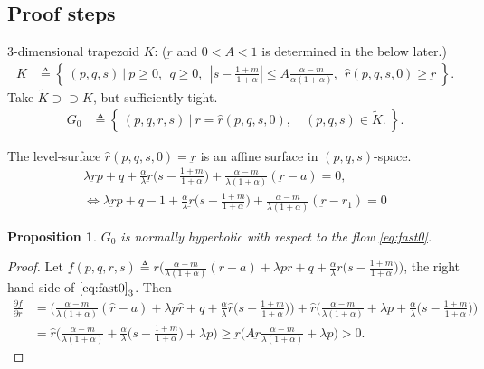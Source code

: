 \documentclass[a4paper,11pt]{article}
\newtheorem{proposition}{Proposition}[section]
\begin{document}
\subsection{Proof steps}

$3$-dimensional trapezoid $K$: ($\underbar{r}$ and $0<A<1$ is determined in the below later.)
\begin{align*}
 K &\triangleq \left\{ \: (p,q,s) \: | \:  p\ge0, ~~ q\ge0, ~~ \left|s-\frac{1+m}{1+\alpha}\right| \le A \frac{\alpha-m}{\alpha(1+\alpha)}, ~~ \hat{r}(p,q,s,0)\ge \underbar{r}\: \right\}.
\end{align*}
Take $\tilde{K} \supset\supset K$, but sufficiently tight.
\begin{align*}
 G_0 &\triangleq \left\{ \: (p,q,r,s) \: | \: r=\hat{r}(p,q,s,0), \quad (p,q,s)\in \tilde{K}. \: \right\}.
\end{align*}

The level-surface $\hat{r}(p,q,s,0) = \underbar{r}$ is an affine surface in $(p,q,s)$-space.
\begin{equation}
 \begin{aligned}
  \lambda \underbar{r}p + q +\frac{\alpha}{\lambda}\underbar{r}\big(s- \frac{1+m}{1+\alpha}\big) + \frac{\alpha-m}{\lambda(1+\alpha)}(\underbar{r}-a) = 0,\\
  \Longleftrightarrow \lambda \underbar{r}p + q-1 +\frac{\alpha}{\lambda}\underbar{r}\big(s- \frac{1+m}{1+\alpha}\big) + \frac{\alpha-m}{\lambda(1+\alpha)}(\underbar{r}-r_1) = 0
 \end{aligned}
\end{equation}


\begin{proposition} 
$G_0$ is normally hyperbolic with respect to the flow \eqref{eq:fast0}. 
\end{proposition}
\begin{proof}
 Let $f(p,q,r,s) \triangleq r\Big(\frac{\alpha-m}{\lambda(1+\alpha)}(r-a) + \lambda pr + q +\frac{\alpha}{\lambda}r\big(s- \frac{1+m}{1+\alpha}\big)\Big)$, the right hand side of $\eqref{eq:fast0}_3$. Then 
 \begin{align*}
 \frac{\partial f}{\partial r} &= \Big(\frac{\alpha-m}{\lambda(1+\alpha)}(\hat{r}-a) + \lambda p\hat{r} + q +\frac{\alpha}{\lambda}\hat{r}\big(s- \frac{1+m}{1+\alpha}\big)\Big) + \hat{r}\Big(\frac{\alpha-m}{\lambda(1+\alpha)} + \lambda p + \frac{\alpha}{\lambda}\big(s- \frac{1+m}{1+\alpha}\big)\Big)\\
 &= \hat{r}\Big(\frac{\alpha-m}{\lambda(1+\alpha)} + \frac{\alpha}{\lambda}\big(s- \frac{1+m}{1+\alpha}\big) + \lambda p\Big)\ge \underbar{r}\Big(A\underbar{r}\frac{\alpha-m}{\lambda(1+\alpha)} + \lambda p\Big)>0.
 \end{align*}
\end{proof}
\end{document}

